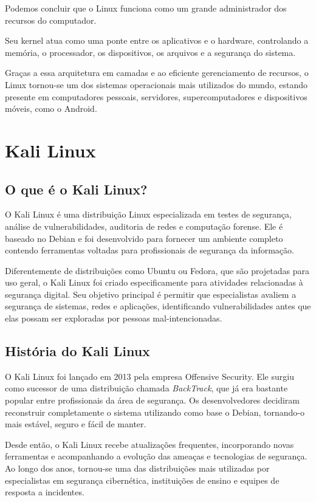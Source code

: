 \documentclass{article}
\begin{document}
Podemos concluir que o Linux funciona como um grande administrador dos recursos do computador.

Seu kernel atua como uma ponte entre os aplicativos e o hardware, controlando a memória, o processador, os dispositivos, os arquivos e a segurança do sistema.

Graças a essa arquitetura em camadas e ao eficiente gerenciamento de recursos, o Linux tornou-se um dos sistemas operacionais mais utilizados do mundo, estando presente em computadores pessoais, servidores, supercomputadores e dispositivos móveis, como o Android.


\section{Kali Linux}

\subsection{O que é o Kali Linux?}

O Kali Linux é uma distribuição Linux especializada em testes de segurança, análise de vulnerabilidades, auditoria de redes e computação forense. Ele é baseado no Debian e foi desenvolvido para fornecer um ambiente completo contendo ferramentas voltadas para profissionais de segurança da informação.

Diferentemente de distribuições como Ubuntu ou Fedora, que são projetadas para uso geral, o Kali Linux foi criado especificamente para atividades relacionadas à segurança digital. Seu objetivo principal é permitir que especialistas avaliem a segurança de sistemas, redes e aplicações, identificando vulnerabilidades antes que elas possam ser exploradas por pessoas mal-intencionadas.

\subsection{História do Kali Linux}

O Kali Linux foi lançado em 2013 pela empresa Offensive Security. Ele surgiu como sucessor de uma distribuição chamada \textit{BackTrack}, que já era bastante popular entre profissionais da área de segurança. Os desenvolvedores decidiram reconstruir completamente o sistema utilizando como base o Debian, tornando-o mais estável, seguro e fácil de manter.

Desde então, o Kali Linux recebe atualizações frequentes, incorporando novas ferramentas e acompanhando a evolução das ameaças e tecnologias de segurança. Ao longo dos anos, tornou-se uma das distribuições mais utilizadas por especialistas em segurança cibernética, instituições de ensino e equipes de resposta a incidentes.
\end{document}
